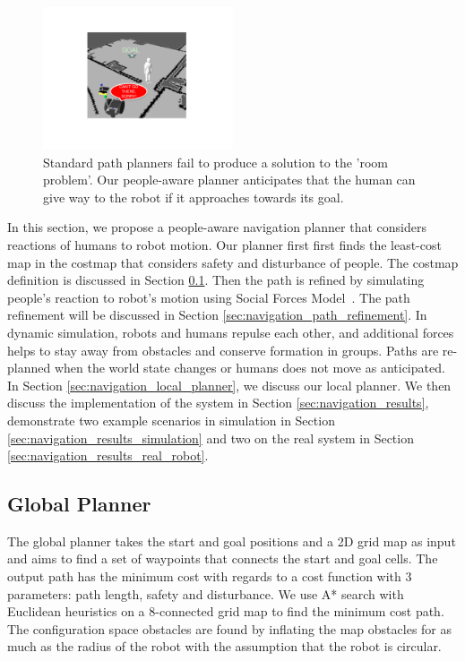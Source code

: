 \begin{figure}[t!]
\centering
\includegraphics[width=0.5\textwidth]{pics/room_crop}
\caption{Standard path planners fail to produce a solution to the 'room problem'. Our people-aware planner anticipates that the human can give way to the robot if it approaches towards its goal.}
\label{fig:room}
\end{figure}

In this section, we propose a people-aware navigation planner that considers reactions of humans to robot motion. Our planner first first finds the least-cost map in the costmap that considers safety and disturbance of people. The costmap definition is discussed in Section \ref{sec:navigation_global_planner}. Then the path is refined by simulating people's reaction to robot's motion using Social Forces Model~\cite{helbing1995social}. The path refinement will be discussed in Section \ref{sec:navigation_path_refinement}. In dynamic simulation, robots and humans repulse each other, and additional forces helps to stay away from obstacles and conserve formation in groups. Paths are re-planned when the world state changes or humans does not move as anticipated. In Section \ref{sec:navigation_local_planner}, we discuss our local planner. We then discuss the implementation of the system in Section \ref{sec:navigation_results}, demonstrate two example scenarios in simulation in Section \ref{sec:navigation_results_simulation} and two on the real system in Section \ref{sec:navigation_results_real_robot}.


\subsection{Global Planner}
\label{sec:navigation_global_planner}

The global planner takes the start and goal positions and a 2D grid map as input and aims to find a set of waypoints that connects the start and goal cells. The output path has the minimum cost with regards to a cost function with 3 parameters: path length, safety and disturbance. We use A* search with Euclidean heuristics on a 8-connected grid map to find the minimum cost path. The configuration space obstacles are found by inflating the map obstacles for as much as the radius of the robot with the assumption that the robot is circular.

